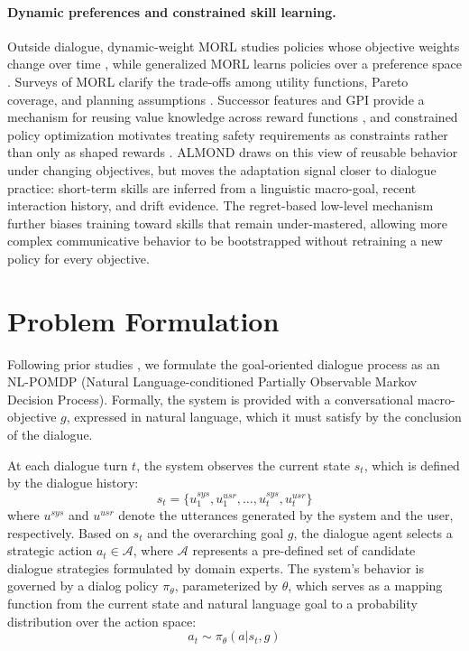 \documentclass[conference]{IEEEtran}
\begin{document}
\paragraph{Dynamic preferences and constrained skill learning.}
Outside dialogue, dynamic-weight MORL studies policies whose objective weights
change over time \cite{abels2019dynamic}, while generalized MORL learns
policies over a preference space \cite{yang2019generalized}. Surveys of MORL
clarify the trade-offs among utility functions, Pareto coverage, and planning
assumptions \cite{hayes2022practical}. Successor features and GPI provide a
mechanism for reusing value knowledge across reward functions
\cite{barreto2017successor,barreto2018transfer}, and constrained policy
optimization motivates treating safety requirements as constraints rather than
only as shaped rewards \cite{achiam2017constrained}. ALMOND draws on this view
of reusable behavior under changing objectives, but moves the adaptation signal
closer to dialogue practice: short-term skills are inferred from a linguistic
macro-goal, recent interaction history, and drift evidence. The regret-based
low-level mechanism further biases training toward skills that remain
under-mastered, allowing more complex communicative behavior to be bootstrapped
without retraining a new policy for every objective.

\section{Problem Formulation}

Following prior studies \cite{he2024planning}, we formulate the goal-oriented dialogue process as an NL-POMDP (Natural Language-conditioned Partially Observable Markov Decision Process). Formally, the system is provided with a conversational macro-objective $g$, expressed in natural language, which it must satisfy by the conclusion of the dialogue. 

At each dialogue turn $t$, the system observes the current state $s_t$, which is defined by the dialogue history:
\begin{equation}
    s_t = \{u^{sys}_1, u^{usr}_1, \dots, u^{sys}_t, u^{usr}_t\}
\end{equation}
where $u^{sys}$ and $u^{usr}$ denote the utterances generated by the system and the user, respectively. Based on $s_t$ and the overarching goal $g$, the dialogue agent selects a strategic action $a_t \in \mathcal{A}$, where $\mathcal{A}$ represents a pre-defined set of candidate dialogue strategies formulated by domain experts. The system's behavior is governed by a dialog policy $\pi_\theta$, parameterized by $\theta$, which serves as a mapping function from the current state and natural language goal to a probability distribution over the action space:
\begin{equation}
    a_t \sim \pi_\theta(a | s_t, g)
\end{equation}
\end{document}

